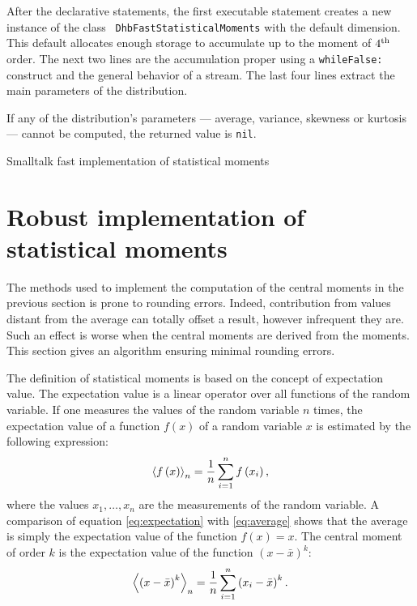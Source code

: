 After the declarative statements, the first executable statement
creates a new instance of the class {\tt
DhbFastStatisticalMoments} with the default dimension. This
default allocates enough storage to accumulate up to the moment of
$4^{\mathop{\textrm{th}}}$ order. The next two lines are the accumulation proper using
a {\tt whileFalse:} construct and the general behavior of a
stream. The last four lines extract the main parameters of the
distribution.

If any of the distribution's parameters --- average, variance,
skewness or kurtosis --- cannot be computed, the returned value is
{\tt nil}.

\begin{listing} Smalltalk fast implementation of statistical moments \label{ls:fastmoments}

\end{listing}


\section{Robust implementation of statistical moments}
\label{sec:robustmoment} The methods used to implement the
computation of the central moments in the previous section is
prone to rounding errors. Indeed, contribution from values distant
from the average can totally offset a result, however infrequent
they are. Such an effect is worse when the central moments are
derived from the moments. This section gives an algorithm ensuring
minimal rounding errors.

The definition of statistical moments is based on the concept of
expectation value. The expectation value is a linear operator over
all functions of the random variable. If one measures the values
of the random variable $n$ times, the expectation value of a
function $f\left(x\right)$ of a random variable $x$ is estimated
by the following expression:
\begin{equation}
\label{eq:expectation}
 \left\langle f\left(x\right)\right\rangle_n
= {1\over n}\sum_{i=1}^n f\left(x_i\right),
\end{equation}
where the values $x_1,\ldots,x_n$ are the measurements of the
random variable. A comparison of equation \ref{eq:expectation}
with \ref{eq:average} shows that the average is simply the
expectation value of the function $f\left(x\right)=x$. The central
moment of order $k$ is the expectation value of the function
$\left(x-\bar{x}\right)^k$:
\begin{equation}
\label{eq:expectmoment}
 \left\langle \left(x-\bar{x}\right)^k\right\rangle_n
= {1\over n}\sum_{i=1}^n \left(x_i-\bar{x}\right)^k.
\end{equation}

